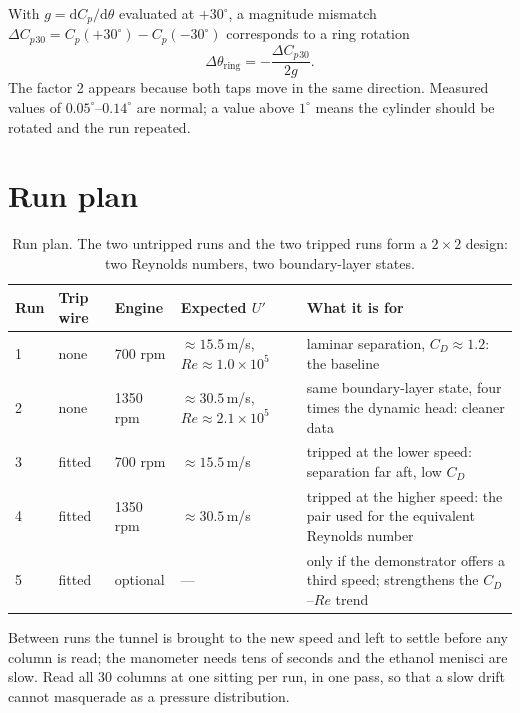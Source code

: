 \documentclass[11pt,a4paper]{article}
\newcommand{\Cp}{\ensuremath{C_p}}
\newcommand{\CD}{\ensuremath{C_D}}
\newcommand{\ReD}{\ensuremath{\mathit{Re}}}
\begin{document}
With $g = \mathrm{d}\Cp/\mathrm{d}\theta$ evaluated at $+30^\circ$, a magnitude mismatch
$\Delta \Cp{}_{30} = \Cp(+30^\circ) - \Cp(-30^\circ)$ corresponds to a ring rotation
\begin{equation}
\Delta\theta_{\text{ring}} = -\frac{\Delta\Cp{}_{30}}{2g}.
\end{equation}
The factor 2 appears because both taps move in the same direction. Measured values of
$0.05^\circ$--$0.14^\circ$ are normal; a value above $1^\circ$ means the cylinder should be
rotated and the run repeated.

\section{Run plan}

\begin{table}[H]
\centering\small
\begin{tabularx}{\textwidth}{@{}llllX@{}}
\toprule
Run & Trip wire & Engine & Expected $U'$ & What it is for \\
\midrule
1 & none & 700 rpm & $\approx 15.5$\,m/s, $\ReD \approx 1.0\times10^{5}$ &
laminar separation, $\CD \approx 1.2$: the baseline \\
2 & none & 1350 rpm & $\approx 30.5$\,m/s, $\ReD \approx 2.1\times10^{5}$ &
same boundary-layer state, four times the dynamic head: cleaner data \\
3 & fitted & 700 rpm & $\approx 15.5$\,m/s &
tripped at the lower speed: separation far aft, low $\CD$ \\
4 & fitted & 1350 rpm & $\approx 30.5$\,m/s &
tripped at the higher speed: the pair used for the equivalent Reynolds number \\
5 & fitted & optional & --- &
only if the demonstrator offers a third speed; strengthens the $\CD$--$\ReD$ trend \\
\bottomrule
\end{tabularx}
\caption{Run plan. The two untripped runs and the two tripped runs form a
$2\times2$ design: two Reynolds numbers, two boundary-layer states.}
\end{table}

Between runs the tunnel is brought to the new speed and left to settle before any column is
read; the manometer needs tens of seconds and the ethanol menisci are slow. Read all 30
columns at one sitting per run, in one pass, so that a slow drift cannot masquerade as a
pressure distribution.
\end{document}
